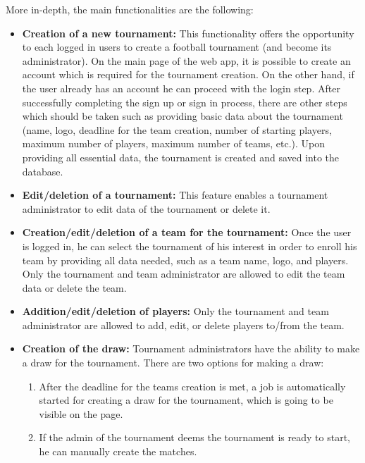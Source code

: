 \noindent More in-depth, the main functionalities are the following:
\begin{itemize}
    \item \textbf{Creation of a new tournament:}
        This functionality offers the opportunity to each logged in users to create a football tournament
        (and become its administrator).
        On the main page of the web app, it is possible to create an account which is required for the
        tournament creation. On the other hand, if the user already has an account he can proceed with the
        login step. After successfully completing the sign up or sign in process, there are other steps which
        should be taken such as providing basic data about the tournament (name, logo, deadline for the team
        creation, number of starting players, maximum number of players, maximum number of teams, etc.).
        Upon providing all essential data, the tournament is created and saved into the database. 
        
        \item \textbf{Edit/deletion of a tournament:}
        This feature enables a tournament administrator to edit data of the tournament or delete it.
        
    \item \textbf{Creation/edit/deletion of a team for the tournament:}
        Once the user is logged in, he can select the tournament of his interest in order to enroll
        his team by providing all data needed, such as a team name, logo, and players. Only the tournament and
        team administrator are allowed to edit the team data or delete the team.
        
    \item \textbf{Addition/edit/deletion of players:}
        Only the tournament and team administrator are allowed to add, edit, or delete players to/from
        the team.

    \item \textbf{Creation of the draw:}
        Tournament administrators have the ability to make a draw for the tournament. There are two options
        for making a draw: 
        \begin{enumerate}
            \item After the deadline for the teams creation is met, a job is automatically started for
            creating a draw for the tournament, which is going to be visible on the page.
            \item If the admin of the tournament deems the tournament is ready to start, he can manually
            create the matches.
        \end{enumerate}
        

\end{itemize}
